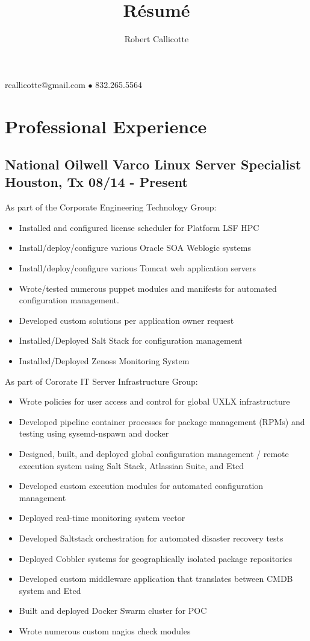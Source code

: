 \documentclass{article}
\title{R\'esum\'e}
\author{Robert Callicotte}
\makeatletter
\renewcommand{\maketitle}{
    \begin{center}
    {\huge\bfseries
    \theauthor}

    \vspace{.25em}

    rcallicotte@gmail.com $\bullet$ 832.265.5564

    \end{center}
  }
\makeatother
\begin{document}
\maketitle

\section{Professional Experience}
  \subsection{National Oilwell Varco \hfill Linux Server Specialist\\
    Houston, Tx \hfill 08/14 - Present
    }
  
  As part of the Corporate Engineering Technology Group:\\
  \begin{itemize}
  \item Installed and configured license scheduler for Platform LSF HPC
  \item Install/deploy/configure various Oracle SOA Weblogic systems
  \item Install/deploy/configure various Tomcat web application servers
  \item Wrote/tested numerous puppet modules and manifests for automated configuration management.
  \item Developed custom solutions per application owner request
  \item Installed/Deployed Salt Stack for configuration management
  \item Installed/Deployed Zenoss Monitoring System
  \end{itemize}  

  As part of Cororate IT Server Infrastructure Group:\\
  \begin{itemize}
  \item Wrote policies for user access and control for global UXLX infrastructure
  \item Developed pipeline container processes for package management (RPMs) and testing using sysemd-nspawn and docker
  \item Designed, built, and deployed global configuration management / remote execution system using Salt Stack, Atlassian Suite, and Etcd
  \item Developed custom execution modules for automated configuration management
  \item Deployed real-time monitoring system vector
  \item Developed Saltstack orchestration for automated disaster recovery tests
  \item Deployed Cobbler systems for geographically isolated package repositories
  \item Developed custom middleware application that translates between CMDB system and Etcd
  \item Built and deployed Docker Swarm cluster for POC
  \item Wrote numerous custom nagios check modules
  \end{itemize}
\end{document}
